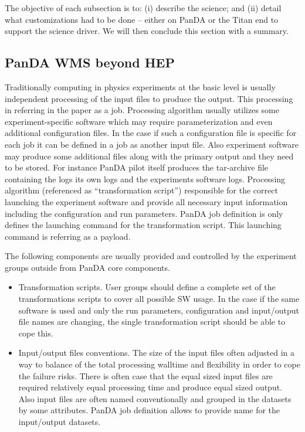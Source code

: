 
%
%

The objective of each subsection is to:
(i) describe the science; and
(ii) detail what customizations had to be done -- either on PanDA or the Titan
    end to support the science driver.
We will then conclude this section with a summary.

\subsection{PanDA WMS beyond HEP}
\label{subsec:panda_beyond}

Traditionally computing in physics experiments at the basic level is usually
independent processing of the input files to produce the output. This
processing in referring in the paper as a job. Processing algorithm usually
utilizes some experiment-specific software which may require parameterization
and even additional configuration files. In the case if such a configuration
file is specific for each job it can be defined in a job as another input file.
Also experiment software may produce some additional files along with the
primary output and they need to be stored. For instance PanDA pilot itself
produces the tar-archive file containing the logs its own logs and the
experiments software logs. Processing algorithm (referenced as ``transformation
script'') responsible for the correct launching the experiment software and
provide all necessary input information including the configuration and run
parameters. PanDA job definition is only defines the launching command for the
transformation script. This launching command is referring as a payload.

The following components are usually provided and controlled by the experiment groups outside from PanDA core components.
\begin{itemize}
    \item Transformation scripts. User groups should define a complete set of
        the transformations scripts to cover all possible SW usage. In the case
        if the same software is used and only the run parameters, configuration
        and input/output file names are changing, the single transformation
        script should be able to cope this.
    \item Input/output files conventions. The size of the input files often
        adjusted in a way to balance of the total processing walltime and
        flexibility in order to cope the failure risks. There is often case
        that the equal sized input files are required relatively equal
        processing time and produce equal sized output. Also input files are
        often named conventionally and grouped in the datasets by some
        attributes. PanDA job definition allows to provide name for the
        input/output datasets.
\end{itemize}

